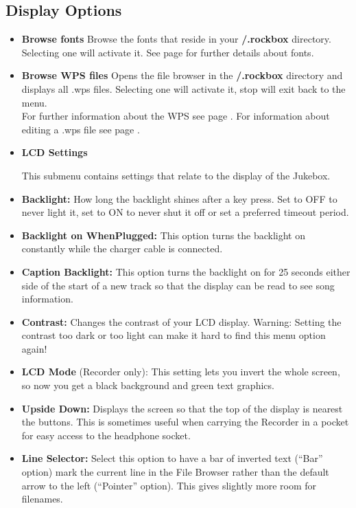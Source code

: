 \subsection{\label{ref:Displayoptions}Display Options}

\begin{itemize}
\item \textbf{Browse fonts}
Browse the fonts that reside in your \textbf{/.rockbox} directory.
Selecting one will activate it.  See page \pageref{ref:Loadingfonts} for further details about fonts.

\item \textbf{Browse WPS files}
Opens the file browser in the \textbf{/.rockbox} directory and displays
all .wps files. Selecting one will activate it, stop will exit back to
the menu.\\

For further information about the WPS see page \pageref{ref:WPS}. For
information  about editing a .wps file see page \pageref{ref:ConfiguringtheWPS}.

\item \textbf{LCD Settings}

This submenu contains settings that relate to the display of the
Jukebox.
\item \textbf{Backlight:} 
How long the backlight shines after a key
press. Set to OFF to never light it, set to ON to never shut it off or
set a preferred timeout period.
\item \textbf{Backlight on WhenPlugged:}
This option turns the backlight on constantly while the charger cable is connected.
\item \textbf{Caption Backlight:} This option turns the backlight on for
25 seconds either side of the start of a new track so that the display
can be read to see song information.
\item \textbf{Contrast:} Changes the contrast of your LCD display.
Warning: Setting the contrast too dark or too light can make it hard to
find this menu option again!
\item \textbf{LCD Mode} (Recorder only): This setting lets you invert
the whole screen, so now you get a black background and green text
graphics.
\item \textbf{Upside Down: }Displays the screen so that the top of the
display is nearest the buttons.  This is sometimes useful when carrying
the Recorder in a pocket for easy access to the headphone socket.
\item \textbf{Line Selector: }Select this option to have a bar of
inverted text (``Bar'' option) mark the current line in the File
Browser rather than the default arrow to the left (``Pointer'' option).
 This gives slightly more room for filenames.


\end{itemize}
